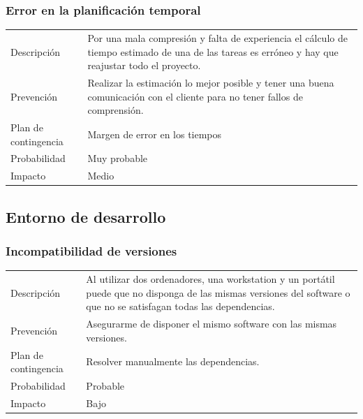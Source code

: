 \subsubsection{Error en la planificaci\'{o}n temporal}
\begin{table}[H]
    \begin{center}
        \begin{tabular}{l p{8cm}}
            Descripci\'{o}n                 & Por una mala compresión y falta de experiencia el cálculo
            de tiempo estimado de una de las tareas es erróneo y hay que reajustar todo el proyecto. \\
            Prevenci\'{o}n                  & Realizar la estimación lo mejor posible y tener una buena
            comunicación con el cliente para no tener fallos de comprensión. \\ 
            Plan de contingencia            & Margen de error en los tiempos \\
            Probabilidad                    & Muy probable \\
            Impacto                         & Medio\\
        \end{tabular}
    \end{center}
    
\end{table}
\subsection{Entorno de desarrollo}
\subsubsection{Incompatibilidad de versiones}
\begin{table}[H]
    \begin{center}
        \begin{tabular}{l p{8cm}}
            Descripci\'{o}n                 & Al utilizar dos ordenadores, una workstation y un port\'{a}til puede que no disponga de las mismas
            versiones del software o que no se satisfagan todas las dependencias. \\
            Prevenci\'{o}n                  & Asegurarme de disponer el mismo software con las mismas versiones. \\ 
            Plan de contingencia            & Resolver manualmente las dependencias. \\
            Probabilidad                    & Probable \\
            Impacto                         & Bajo\\
        \end{tabular}
    \end{center}
    
\end{table}
